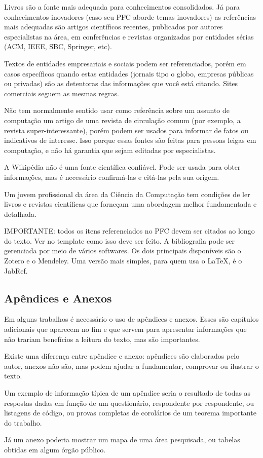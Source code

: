 Livros são a fonte mais adequada para conhecimentos consolidados. Já para conhecimentos inovadores (caso seu PFC aborde temas inovadores) as referências mais adequadas são artigos científicos recentes, publicados por autores especialistas na área, em conferências e revistas organizadas por entidades sérias (ACM, IEEE, SBC, Springer, etc).

Textos de entidades empresariais e sociais podem ser referenciados, porém em casos específicos quando estas entidades (jornais tipo o globo, empresas públicas ou privadas) são as detentoras das informações que você está citando. Sites comerciais seguem as mesmas regras.

Não tem normalmente sentido usar como referência sobre um assunto de computação um artigo de uma revista de circulação comum (por exemplo, a revista super-interessante), porém podem ser usados para informar de fatos ou indicativos de interesse. Isso porque essas fontes são feitas para pessoas leigas em computação, e não há garantia que sejam editadas por especialistas.

A Wikipédia não é uma fonte científica confiável. Pode ser usada para obter informações, mas é necessário confirmá-las e citá-las pela sua origem.

Um jovem profissional da área da Ciência da Computação tem condições de ler livros e revistas científicas que forneçam uma abordagem melhor fundamentada e detalhada.

IMPORTANTE: todos os itens referenciados no PFC devem ser citados ao longo do texto. Ver no template como isso deve ser feito.
A bibliografia pode ser gerenciada por meio de vários softwares. Os dois principais disponíveis são o Zotero e o Mendeley. Uma versão mais simples, para quem usa  o LaTeX, é o JabRef.

\subsection{Apêndices e Anexos}

Em alguns trabalhos é necessário o uso de apêndices e anexos. Esses são capítulos adicionais que aparecem no fim e que servem para apresentar informações que não trariam benefícios a leitura do texto, mas são importantes.

Existe uma diferença entre apêndice e anexo: apêndices são elaborados pelo autor, anexos não são, mas podem ajudar a fundamentar, comprovar ou ilustrar o texto.

Um exemplo de informação típica de um apêndice seria o resultado de todas as respostas dadas em função de um questionário, respondente por respondente, ou listagens de código, ou provas completas de corolários de um teorema importante do trabalho.

Já um anexo poderia mostrar um mapa de uma área pesquisada, ou tabelas obtidas em algum órgão público.